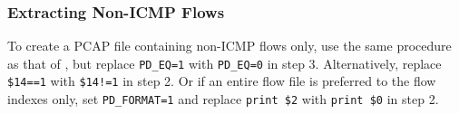 \documentclass[documentation]{subfiles}
\begin{document}
\subsubsection{Extracting Non-ICMP Flows}
To create a PCAP file containing non-ICMP flows only, use the same procedure as that of ,
but replace {\tt PD\_EQ=1} with {\tt PD\_EQ=0} in step 3.
Alternatively, replace {\tt \$14==1} with {\tt \$14!=1} in step 2.
Or if an entire flow file is preferred to the flow indexes only, set {\tt PD\_FORMAT=1} and replace {\tt print \$2} with {\tt print \$0} in step 2.

%
\end{document}
